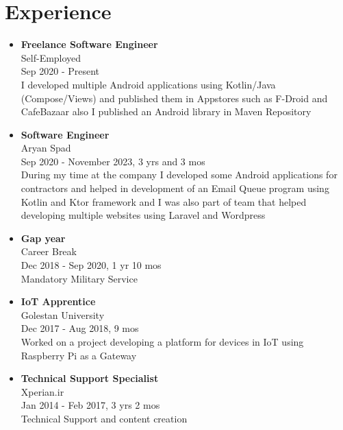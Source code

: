 \section*{\LARGE{Experience}}
\begin{itemize}
    \item \large{\textbf{Freelance Software Engineer}\\Self-Employed\\}\normalsize{Sep 2020 - Present\\I developed multiple Android applications using Kotlin/Java (Compose/Views) and published them in Appstores such as F-Droid and CafeBazaar also I published an Android library in Maven Repository}
    \item \large{\textbf{Software Engineer}\\Aryan Spad\\}\normalsize{Sep 2020 - November 2023, 3 yrs and 3 mos\\During my time at the company I developed some Android applications for contractors and helped in development of an Email Queue program using Kotlin and Ktor framework and I was also part of team that helped developing multiple websites using Laravel and Wordpress}
    \item \large{\textbf{Gap year}\\Career Break\\}\normalsize{Dec 2018 - Sep 2020, 1 yr 10 mos\\ Mandatory Military Service}
    \item \large{\textbf{IoT Apprentice}\\Golestan University\\}\normalsize{Dec 2017 - Aug 2018, 9 mos\\Worked on a project developing a platform for devices in IoT using Raspberry Pi as a Gateway}
    \item \large{\textbf{Technical Support Specialist}\\Xperian.ir\\}\normalsize{Jan 2014 - Feb 2017, 3 yrs 2 mos\\Technical Support and content creation}
\end{itemize}